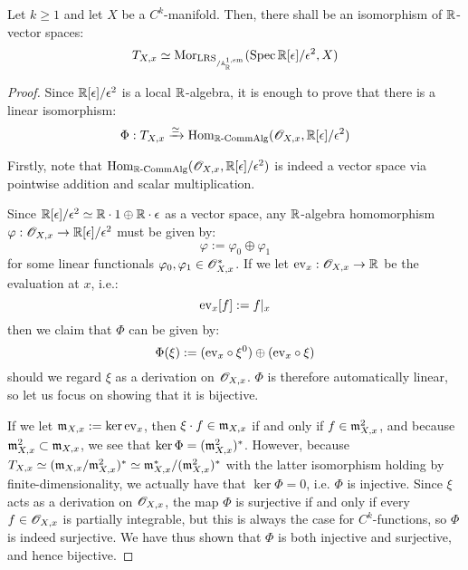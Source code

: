         \begin{lemma} \label{lemma: tangent_spaces_and_dual_numbers}
            Let $k \geq 1$ and let $X$ be a $C^k$-manifold. Then, there shall be an isomorphism of $\mathbb{R}$-vector spaces:
                $$T_{X, x} \simeq \mathrm{Mor}_{\mathrm{LRS}_{/\mathbb{A}^{1, \mathrm{sm}}_{\mathbb{R}}}}(\operatorname{Spec} \mathbb{R}[\epsilon]/\epsilon^2, X)$$
        \end{lemma}
            \begin{proof}
                Since $\mathbb{R}[\epsilon]/\epsilon^2$ is a local $\mathbb{R}$-algebra, it is enough to prove that there is a linear isomorphism:
                    $$\Phi: T_{X, x} \xrightarrow[]{\simeq} \mathrm{Hom}_{\mathbb{R}\text{-}\mathrm{Comm}\mathrm{Alg}}(\mathscr{O}_{X, x}, \mathbb{R}[\epsilon]/\epsilon^2)$$

                Firstly, note that $\mathrm{Hom}_{\mathbb{R}\text{-}\mathrm{Comm}\mathrm{Alg}}(\mathscr{O}_{X, x}, \mathbb{R}[\epsilon]/\epsilon^2)$ is indeed a vector space via pointwise addition and scalar multiplication.
                    
                Since $\mathbb{R}[\epsilon]/\epsilon^2 \simeq \mathbb{R} \cdot 1 \oplus \mathbb{R} \cdot \epsilon$ as a vector space, any $\mathbb{R}$-algebra homomorphism $\varphi: \mathscr{O}_{X, x} \to \mathbb{R}[\epsilon]/\epsilon^2$ must be given by:
                    $$\varphi := \varphi_0 \oplus \varphi_1$$
                for some linear functionals $\varphi_0, \varphi_1 \in \mathscr{O}_{X, x}^*$. If we let $\mathrm{ev}_x: \mathscr{O}_{X, x} \to \mathbb{R}$ be the evaluation at $x$, i.e.:
                    $$\mathrm{ev}_x[f] := f|_x$$
                then we claim that $\Phi$ can be given by:
                    $$\Phi(\xi) := (\mathrm{ev}_x \circ \xi^0) \oplus (\mathrm{ev}_x \circ \xi)$$
                should we regard $\xi$ as a derivation on $\mathscr{O}_{X, x}$. $\Phi$ is therefore automatically linear, so let us focus on showing that it is bijective. 
                
                If we let $\mathfrak{m}_{X, x} := \ker \mathrm{ev}_x$, then $\xi \cdot f \in \mathfrak{m}_{X, x}$ if and only if $f \in \mathfrak{m}_{X, x}^2$, and because $\mathfrak{m}_{X, x}^2 \subset \mathfrak{m}_{X, x}$, we see that $\ker \Phi = (\mathfrak{m}_{X, x}^2)^*$. However, because $T_{X, x} \simeq ( \mathfrak{m}_{X, x}/ \mathfrak{m}_{X, x}^2 )^* \simeq \mathfrak{m}_{X, x}^*/(\mathfrak{m}_{X, x}^2)^*$ with the latter isomorphism holding by finite-dimensionality, we actually have that $\ker \Phi = 0$, i.e. $\Phi$ is injective. Since $\xi$ acts as a derivation on $\mathscr{O}_{X, x}$, the map $\Phi$ is surjective if and only if every $f \in \mathscr{O}_{X, x}$ is partially integrable, but this is always the case for $C^k$-functions, so $\Phi$ is indeed surjective. We have thus shown that $\Phi$ is both injective and surjective, and hence bijective. 
            \end{proof}
